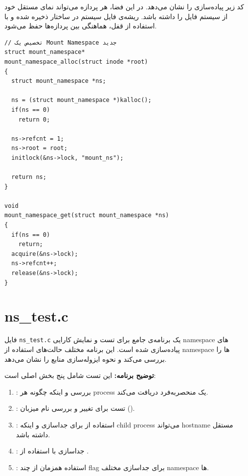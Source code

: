 \documentclass[12pt]{article}
\begin{document}
کد زیر پیاده‌سازی  را نشان می‌دهد. در این فضا، هر پردازه
می‌تواند نمای مستقل خود از سیستم فایل را داشته باشد. ریشه‌ی فایل سیستم
در ساختار  ذخیره شده و با استفاده از قفل، هماهنگی بین پردازه‌ها
حفظ می‌شود.

\begin{LTR}
\begin{lstlisting}
// تخصیص یک Mount Namespace جدید
struct mount_namespace*
mount_namespace_alloc(struct inode *root)
{
  struct mount_namespace *ns;
  
  ns = (struct mount_namespace *)kalloc();
  if(ns == 0)
    return 0;
  
  ns->refcnt = 1;
  ns->root = root;
  initlock(&ns->lock, "mount_ns");
  
  return ns;
}

void
mount_namespace_get(struct mount_namespace *ns)
{
  if(ns == 0)
    return;
  acquire(&ns->lock);
  ns->refcnt++;
  release(&ns->lock);
}
\end{lstlisting}
\end{LTR}

\section{ns\_test.c}

فایل \texttt{ns\_test.c} یک برنامه‌ی جامع برای تست و نمایش کارایی namespace های پیاده‌سازی شده است. این برنامه مختلف حالت‌های استفاده از namespace ها را بررسی می‌کند و نحوه ایزوله‌سازی منابع را نشان می‌دهد.

\textbf{توضیح برنامه:} این تست شامل پنج بخش اصلی است:

\begin{enumerate}
\item \textbf{}: بررسی \texttt{} و اینکه چگونه هر process یک  منحصربه‌فرد دریافت می‌کند.

\item \textbf{}: تست \texttt{} برای تغییر و بررسی نام میزبان (\texttt{}).

\item \textbf{}: استفاده از \texttt{} برای جداسازی \texttt{} و اینکه child process می‌تواند hostname مستقل داشته باشد.

\item \textbf{}: جداسازی \texttt{} با استفاده از \texttt{}.

\item \textbf{}: استفاده همزمان از چند flag برای جداسازی مختلف namespace ها.
\end{enumerate}
\end{document}
